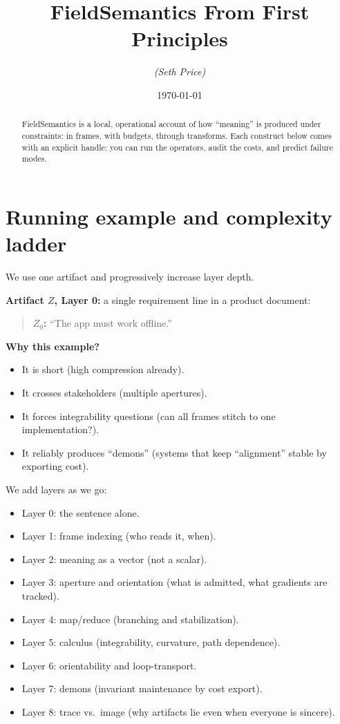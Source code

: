\documentclass[11pt]{article}
\title{FieldSemantics From First Principles}
\author{\emph{(Seth Price)}}
\date{\today}
\begin{document}
\maketitle

\begin{abstract}
FieldSemantics is a local, operational account of how ``meaning'' is produced under constraints: in frames, with budgets, through transforms. Each construct below comes with an explicit handle: you can run the operators, audit the costs, and predict failure modes.
\end{abstract}

\section{Running example and complexity ladder}

We use one artifact and progressively increase layer depth.

\textbf{Artifact $Z$, Layer 0:} a single requirement line in a product document:

\begin{quote}
\textbf{$Z_0$:} ``The app must work offline.''
\end{quote}

\textbf{Why this example?}
\begin{itemize}[leftmargin=2em]
  \item It is short (high compression already).
  \item It crosses stakeholders (multiple apertures).
  \item It forces integrability questions (can all frames stitch to one implementation?).
  \item It reliably produces ``demons'' (systems that keep ``alignment'' stable by exporting cost).
\end{itemize}

We add layers as we go:
\begin{itemize}[leftmargin=2em]
  \item Layer 0: the sentence alone.
  \item Layer 1: frame indexing (who reads it, when).
  \item Layer 2: meaning as a vector (not a scalar).
  \item Layer 3: aperture and orientation (what is admitted, what gradients are tracked).
  \item Layer 4: map/reduce (branching and stabilization).
  \item Layer 5: calculus (integrability, curvature, path dependence).
  \item Layer 6: orientability and loop-transport.
  \item Layer 7: demons (invariant maintenance by cost export).
  \item Layer 8: trace vs.~image (why artifacts lie even when everyone is sincere).
\end{itemize}
\end{document}
